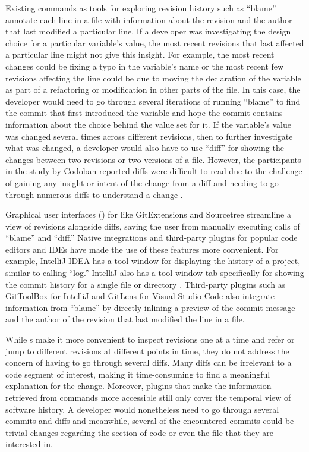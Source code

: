 Existing  commands as tools for exploring revision history such as ``blame'' \cite{gitblame} annotate each line in a file with information about the revision and the author that last modified a particular line.
If a developer was investigating the design choice for a particular variable's value, 
the most recent revisions that last affected a particular line might not give this insight.
For example, the most recent changes could be fixing a typo in the variable's name or the most recent few revisions affecting the line could be due to moving the declaration of the variable as part of a refactoring or modification in other parts of the file.
In this case, the developer would need to go through several iterations of running ``blame'' to find the commit that first introduced the variable and hope the commit contains information about the choice behind the value set for it.
If the variable's value was changed several times across different revisions, 
then to further investigate what was changed, 
a developer would also have to use  ``diff'' \cite{gitdiff} for showing the changes between two revisions or two versions of a file.
However, the participants in the study by Codoban \etal reported diffs were difficult to read due to the challenge of gaining any insight or intent of the change from a diff and needing to go through numerous diffs to understand a change \cite{codoban_software_2015}.

Graphical user interfaces () for  like GitExtensions \cite{gitextensions} and Sourcetree \cite{sourcetree} streamline a view of revisions alongside diffs, saving the user from manually executing calls of  ``blame'' and ``diff.'' 
Native  integrations and third-party plugins for popular code editors and IDEs have made the use of these  features more convenient. 
For example, IntelliJ IDEA \cite{intellij} has a tool window for displaying the  history of a project, similar to calling  ``log.''
IntelliJ also has a tool window tab specifically for showing the commit history for a single file or directory \cite{intellij-showhistory}.
Third-party plugins such as GitToolBox \cite{gittoolbox} for IntelliJ and GitLens \cite{gitlens} for Visual Studio Code also integrate information from  ``blame'' by directly inlining a preview of the commit message and the author of the revision that last modified the line in a file.

While s make it more convenient to inspect revisions one at a time and refer or jump to different revisions at different points in time, they do not address the concern of having to go through several diffs. Many diffs can be irrelevant to a code segment of interest, making it time-consuming to find a meaningful explanation for the change.
Moreover, plugins that make the information retrieved from  commands more accessible still only cover the temporal view of software history.
A developer would nonetheless need to go through several commits and diffs and meanwhile, 
several of the encountered commits could be trivial changes regarding the section of code or even the file that they are interested in.

